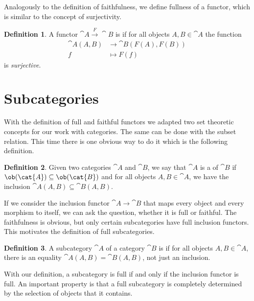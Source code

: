 \documentclass{article}
\theoremstyle{definition}
\newtheorem{definition}{Definition}
\begin{document}
Analogously to the definition of faithfulness, we define fullness of a functor, which is similar to the concept of surjectivity.

\begin{definition}
  A functor $\cat{A} \xrightarrow{F} \cat{B}$ is  if for all objects $A, B \in \cat{A}$ the function
  \begin{align*}
    \cat{A}(A, B) &\to \cat{B}(F(A), F(B)) \\
    f &\mapsto F(f)
  \end{align*}
  is \emph{surjective}.
\end{definition}


\section{Subcategories}

With the definition of full and faithful functors we adapted two set theoretic concepts for our work with categories.
The same can be done with the subset relation.
This time there is one obvious way to do it which is the following definition.

\begin{definition}
  Given two categories $\cat{A}$ and $\cat{B}$, we say that $\cat{A}$ is a  of $\cat{B}$ if $\ob(\cat{A}) \subseteq \ob(\cat{B})$ and for all objects $A, B \in \cat{A}$, we have the inclusion $\cat{A}(A, B) \subseteq \cat{B}(A, B)$.
\end{definition}

If we consider the inclusion functor $\cat{A} \to \cat{B}$ that maps every object and every morphism to itself, we can ask the question, whether it is full or faithful.
The faithfulness is obvious, but only certain subcategories have full inclusion functors.
This motivates the definition of full subcategories.

\begin{definition}
  A subcategory $\cat{A}$ of a category $\cat{B}$ is  if for all objects $A, B \in \cat{A}$, there is an equality $\cat{A}(A, B) = \cat{B}(A, B)$, not just an inclusion.
\end{definition}

With our definition, a subcategory is full if and only if the inclusion functor is full.
An important property is that a full subcategory is completely determined by the selection of objects that it contains.
\end{document}
